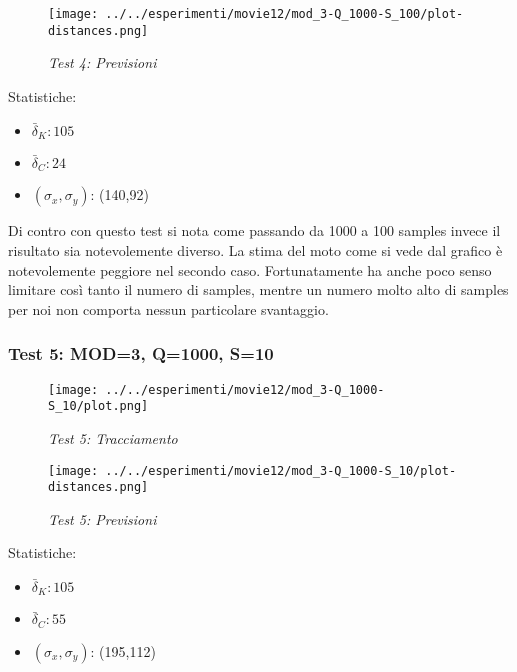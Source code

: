 \begin{figure}[hb]
\centering
\texttt{[image: ../../esperimenti/movie12/mod\_3-Q\_1000-S\_100/plot-distances.png]}
\caption{\textit{Test 4: Previsioni}}
\end{figure}

Statistiche:
\begin{itemize}
\item \begin{math} \bar \delta_K: 105 \end{math}
\item \begin{math} \bar \delta_C: 24 \end{math}
\item \begin{math}(\sigma_x,\sigma_y)\end{math}: (140,92)
\end{itemize}


Di contro con questo test si nota come passando da 1000 a 100 samples invece il risultato sia notevolemente diverso. La stima del moto come si vede dal grafico è notevolemente peggiore nel secondo caso. 
Fortunatamente ha anche poco senso limitare così tanto il numero di samples, mentre un numero molto alto di samples per noi non comporta nessun particolare svantaggio. 

\newpage
\subsubsection{Test 5: MOD=3, Q=1000, S=10}

\begin{figure}[hb]
\centering
\texttt{[image: ../../esperimenti/movie12/mod\_3-Q\_1000-S\_10/plot.png]}
\caption{\textit{Test 5: Tracciamento}}
\end{figure}

\begin{figure}[hb]
\centering
\texttt{[image: ../../esperimenti/movie12/mod\_3-Q\_1000-S\_10/plot-distances.png]}
\caption{\textit{Test 5: Previsioni}}
\end{figure}

Statistiche:
\begin{itemize}
\item \begin{math} \bar \delta_K: 105 \end{math}
\item \begin{math} \bar \delta_C: 55 \end{math}
\item \begin{math}(\sigma_x,\sigma_y)\end{math}: (195,112)
\end{itemize}


